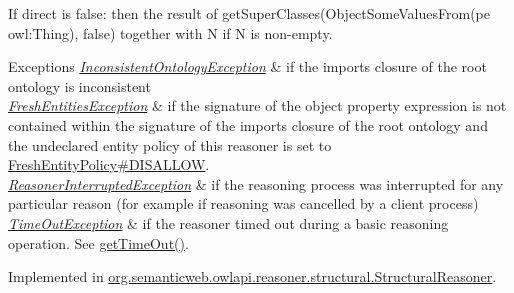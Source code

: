 If {\ttfamily direct} is {\ttfamily false}\-: then the result of {\ttfamily get\-Super\-Classes(Object\-Some\-Values\-From(pe owl\-:\-Thing), false)} together with {\ttfamily N} if {\ttfamily N} is non-\/empty.


\begin{DoxyExceptions}{Exceptions}
{\em \hyperlink{classorg_1_1semanticweb_1_1owlapi_1_1reasoner_1_1_inconsistent_ontology_exception}{Inconsistent\-Ontology\-Exception}} & if the imports closure of the root ontology is inconsistent \\
\hline
{\em \hyperlink{classorg_1_1semanticweb_1_1owlapi_1_1reasoner_1_1_fresh_entities_exception}{Fresh\-Entities\-Exception}} & if the signature of the object property expression is not contained within the signature of the imports closure of the root ontology and the undeclared entity policy of this reasoner is set to \hyperlink{enumorg_1_1semanticweb_1_1owlapi_1_1reasoner_1_1_fresh_entity_policy_a762eae6d5b2449d125311ecaabfdc8d0}{Fresh\-Entity\-Policy\#\-D\-I\-S\-A\-L\-L\-O\-W}. \\
\hline
{\em \hyperlink{classorg_1_1semanticweb_1_1owlapi_1_1reasoner_1_1_reasoner_interrupted_exception}{Reasoner\-Interrupted\-Exception}} & if the reasoning process was interrupted for any particular reason (for example if reasoning was cancelled by a client process) \\
\hline
{\em \hyperlink{classorg_1_1semanticweb_1_1owlapi_1_1reasoner_1_1_time_out_exception}{Time\-Out\-Exception}} & if the reasoner timed out during a basic reasoning operation. See \hyperlink{interfaceorg_1_1semanticweb_1_1owlapi_1_1reasoner_1_1_o_w_l_reasoner_a44b2c968f989afe5290db29c90faa164}{get\-Time\-Out()}. \\
\hline
\end{DoxyExceptions}


Implemented in \hyperlink{classorg_1_1semanticweb_1_1owlapi_1_1reasoner_1_1structural_1_1_structural_reasoner_a764718d55b8610aee92a770f0a48134d}{org.\-semanticweb.\-owlapi.\-reasoner.\-structural.\-Structural\-Reasoner}.

